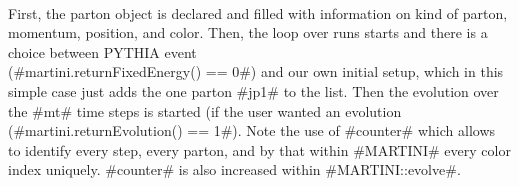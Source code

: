 ~\\
First, the parton object is declared and filled with information on kind of parton, momentum, position, and color.
Then, the loop over runs starts and there is a choice between PYTHIA event\\ (#martini.returnFixedEnergy() == 0#)
and our own initial setup, which in this simple case just adds the one parton #jp1# to the list. Then the evolution
over the #mt# time steps is started (if the user wanted an evolution (#martini.returnEvolution() == 1#).
Note the use of #counter# which allows to identify every step, every parton, and by that within #MARTINI# every color index uniquely.
#counter# is also increased within #MARTINI::evolve#.


